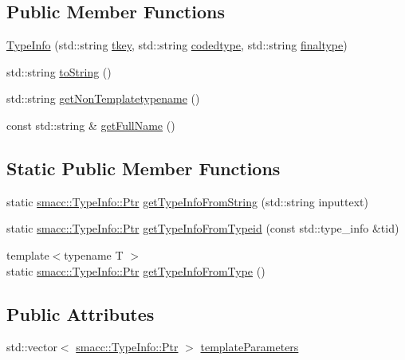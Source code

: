 \subsection*{Public Member Functions}
\begin{DoxyCompactItemize}
\item 
\hyperlink{classsmacc_1_1TypeInfo_a7ae00f0b53f7cdbeb4ab59837074a34c}{Type\+Info} (std\+::string \hyperlink{classsmacc_1_1TypeInfo_ab61d47adea9dbc8b678e06f627d6b1a3}{tkey}, std\+::string \hyperlink{classsmacc_1_1TypeInfo_acdd24c44f12bccdaba8d8c52c9e6d47c}{codedtype}, std\+::string \hyperlink{classsmacc_1_1TypeInfo_ae01f09534a045d2f097a62e9c87cae3d}{finaltype})
\item 
std\+::string \hyperlink{classsmacc_1_1TypeInfo_a1258e044ad8f8a232d66b1428ae9cfae}{to\+String} ()
\item 
std\+::string \hyperlink{classsmacc_1_1TypeInfo_a0b84bf2a0da639a7754536424e11d460}{get\+Non\+Templatetypename} ()
\item 
const std\+::string \& \hyperlink{classsmacc_1_1TypeInfo_a544cc7a10c27f517d45f0381ae049d97}{get\+Full\+Name} ()
\end{DoxyCompactItemize}
\subsection*{Static Public Member Functions}
\begin{DoxyCompactItemize}
\item 
static \hyperlink{classsmacc_1_1TypeInfo_aca0cd51c7c9ef85f6c98dc32878af226}{smacc\+::\+Type\+Info\+::\+Ptr} \hyperlink{classsmacc_1_1TypeInfo_a9bff1505e37e69b869d686a30c507033}{get\+Type\+Info\+From\+String} (std\+::string inputtext)
\item 
static \hyperlink{classsmacc_1_1TypeInfo_aca0cd51c7c9ef85f6c98dc32878af226}{smacc\+::\+Type\+Info\+::\+Ptr} \hyperlink{classsmacc_1_1TypeInfo_a9d871ecc7a19983b37afca0cd219a5f8}{get\+Type\+Info\+From\+Typeid} (const std\+::type\+\_\+info \&tid)
\item 
{\footnotesize template$<$typename T $>$ }\\static \hyperlink{classsmacc_1_1TypeInfo_aca0cd51c7c9ef85f6c98dc32878af226}{smacc\+::\+Type\+Info\+::\+Ptr} \hyperlink{classsmacc_1_1TypeInfo_a6107f1c622531f8bef0eec683480cb2c}{get\+Type\+Info\+From\+Type} ()
\end{DoxyCompactItemize}
\subsection*{Public Attributes}
\begin{DoxyCompactItemize}
\item 
std\+::vector$<$ \hyperlink{classsmacc_1_1TypeInfo_aca0cd51c7c9ef85f6c98dc32878af226}{smacc\+::\+Type\+Info\+::\+Ptr} $>$ \hyperlink{classsmacc_1_1TypeInfo_af50766217e1dcb5c25253c94affd6518}{template\+Parameters}
\end{DoxyCompactItemize}
